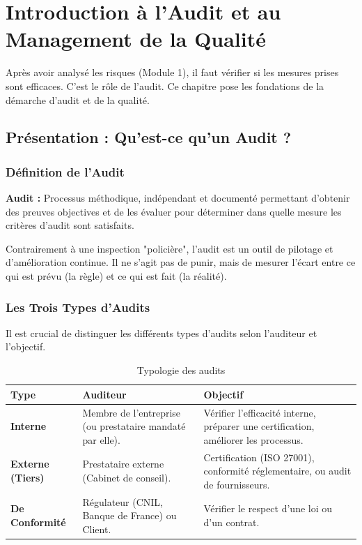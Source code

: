 \chapter{Introduction à l'Audit et au Management de la Qualité}
\label{chap:introaudit}

Après avoir analysé les risques (Module 1), il faut vérifier si les mesures prises sont efficaces. C'est le rôle de l'audit. Ce chapitre pose les fondations de la démarche d'audit et de la qualité.

\section{Présentation : Qu'est-ce qu'un Audit ?}

\subsection{Définition de l'Audit}

\begin{boxdef}
\textbf{Audit :} Processus méthodique, indépendant et documenté permettant d'obtenir des preuves objectives et de les évaluer pour déterminer dans quelle mesure les critères d'audit sont satisfaits.
\end{boxdef}

Contrairement à une inspection "policière", l'audit est un outil de pilotage et d'amélioration continue. Il ne s'agit pas de punir, mais de mesurer l'écart entre ce qui est prévu (la règle) et ce qui est fait (la réalité).

\subsection{Les Trois Types d'Audits}

Il est crucial de distinguer les différents types d'audits selon l'auditeur et l'objectif.

\begin{table}[htbp]
\centering
\begin{tabular}{p{2.5cm}p{4cm}p{5cm}}
    \toprule
    \textbf{Type} & \textbf{Auditeur} & \textbf{Objectif} \\
    \midrule
    \textbf{Interne} & Membre de l'entreprise (ou prestataire mandaté par elle). & Vérifier l'efficacité interne, préparer une certification, améliorer les processus. \\
    \textbf{Externe (Tiers)} & Prestataire externe (Cabinet de conseil). & Certification (ISO 27001), conformité réglementaire, ou audit de fournisseurs. \\
    \textbf{De Conformité} & Régulateur (CNIL, Banque de France) ou Client. & Vérifier le respect d'une loi ou d'un contrat. \\
    \bottomrule
\end{tabular}
\caption{Typologie des audits}
\end{table}

